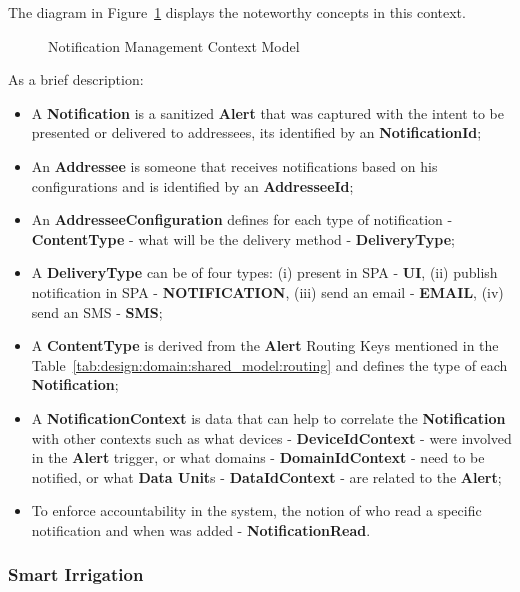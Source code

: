 The diagram in Figure~\ref{fig:design:domain:bounded_contexts:notification:diagram} displays the noteworthy concepts in this context.

\begin{figure}[H]
   \centering
  \resizebox{\columnwidth}{!}
  {
     
  }
  \caption[Notification Management Context Model]{Notification Management Context Model}
  \label{fig:design:domain:bounded_contexts:notification:diagram}
\end{figure}
 
As a brief description:

\begin{itemize}
   \item A \textbf{Notification} is a sanitized \textbf{Alert} that was captured with the intent to be presented or delivered to addressees, its identified by an \textbf{NotificationId};
   \item An \textbf{Addressee} is someone that receives notifications based on his configurations and is identified by an \textbf{AddresseeId};
   \item An \textbf{AddresseeConfiguration} defines for each type of notification - \textbf{ContentType} - what will be the delivery method - \textbf{DeliveryType};
   \item A \textbf{DeliveryType} can be of four types: (i) present in SPA - \textbf{UI}, (ii) publish notification in SPA - \textbf{NOTIFICATION}, (iii) send an email - \textbf{EMAIL}, (iv) send an SMS - \textbf{SMS}; 
   \item A \textbf{ContentType} is derived from the \textbf{Alert} Routing Keys mentioned in the Table~\ref{tab:design:domain:shared_model:routing} and defines the type of each \textbf{Notification};
   \item A \textbf{NotificationContext} is data that can help to correlate the \textbf{Notification} with other contexts such as what devices - \textbf{DeviceIdContext} - were involved in the \textbf{Alert} trigger, or what domains - \textbf{DomainIdContext} - need to be notified, or what \textbf{Data Unit}s - \textbf{DataIdContext} - are related to the \textbf{Alert};
   \item To enforce accountability in the system, the notion of who read a specific notification and when was added - \textbf{NotificationRead}.
\end{itemize}

\subsubsection*{Smart Irrigation}
\label{subsubsec:design:domain:bounded_contexts:irrigation}

